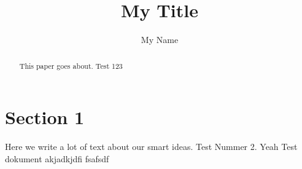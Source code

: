 \documentclass{article}
\begin{document}
\title{My Title}
\author{My Name}
\maketitle

\begin{abstract}
This paper goes about.
Test 123
\end{abstract}

\section{Section 1}
Here we write a lot of text about our smart ideas.
\cite{Eckert2007}
Test Nummer 2. Yeah
Test dokument akjadkjdfi fsafsdf

\end{document}
